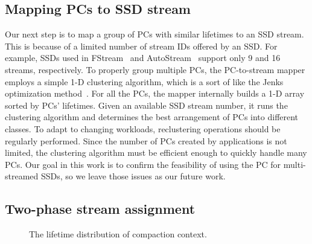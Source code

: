 \vspace{-5pt}
\subsection{Mapping PCs to SSD stream}
Our next step is to map a group of PCs with similar lifetimes to an SSD stream.
This is because of a limited number of stream IDs offered by an SSD. For
example, SSDs used in FStream~\cite{FStream} and AutoStream~\cite{AutoStream}
support only 9 and 16 streams, respectively. To properly group multiple PCs,
the PC-to-stream mapper employs a simple 1-D clustering algorithm, which is a
sort of like the Jenks optimization method~\cite{Jenks}.  For all the PCs, the
mapper internally builds a 1-D array sorted by PCs' lifetimes.  Given an
available SSD stream number, it runs the clustering algorithm and determines
the best arrangement of PCs into different classes.  To adapt to changing
workloads, reclustering operations should be regularly performed. Since the
number of PCs created by applications is not limited, the clustering algorithm
must be efficient enough to quickly handle many PCs. Our goal in this work is
to confirm the feasibility of using the PC for multi-streamed SSDs, so we leave
those issues as our future work.


\vspace{-5pt}
\subsection{Two-phase stream assignment}
\begin{figure}[!t]
\centering
\hspace{1pt}
\hfill
\vspace{-10pt}
\vspace{-10pt}
\caption{The lifetime distribution of compaction context.} 
\label{fig:compaction}
\vspace{-15pt}
\end{figure}

